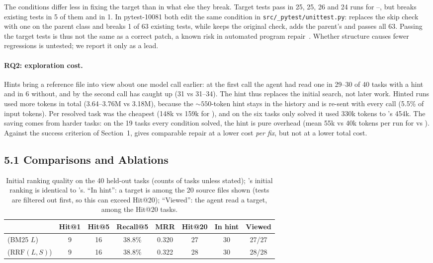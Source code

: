 The conditions differ less in fixing the target than in what else they break. Target tests pass in
25, 25, 26 and 24 runs for \condA--\condD, but \condA{} breaks existing tests in 5 of them and \condC{} in 1.
In pytest-10081 both edit the same condition in \texttt{src/\_pytest/unittest.py}: \condA{} replaces the
skip check with one on the parent class and breaks 1 of 63 existing tests, while \condC{} keeps the
original check, adds the parent's and passes all 63. Passing the target tests is thus not the same as
a correct patch, a known risk in automated program repair~\cite{smith2015cure,yu2019overfitting}.
Whether structure causes fewer regressions is untested; we report it only as a lead.

\paragraph{RQ2: exploration cost.}
Hints bring a reference file into view about one model call earlier: at the first call the agent had
read one in 29--30 of 40 tasks with a hint and in 6 without, and by the second call \condA{} has caught
up (31 vs 31--34). The hint thus replaces the initial search, not later work. Hinted runs used more
tokens in total (3.64--3.76M vs 3.18M), because the ${\sim}550$-token hint stays in the history and is
re-sent with every call (5.5\% of input tokens). Per resolved task \condC{} was the cheapest (148k vs
159k for \condA), and on the six tasks only \condC{} solved it used 330k tokens to \condA's 454k. The
saving comes from harder tasks: on the 19 tasks every condition solved, the hint is pure overhead
(mean 55k vs 40k tokens per run for \condC{} vs \condA). Against the success criterion of Section~1,
\condC{} gives comparable repair at a lower cost \emph{per fix}, but not at a lower total cost.

\subsection*{5.1 Comparisons and Ablations}

\begin{table}[h]
\centering\small
\caption{Initial ranking quality on the 40 held-out tasks (counts of tasks unless stated); \condD's
initial ranking is identical to \condC's. ``In hint'': a target is among the 20 source files shown
(tests are filtered out first, so this can exceed Hit@20); ``Viewed'': the agent read a target, among
the Hit@20 tasks.}
\label{tab:loc}
\begin{tabular}{@{}lccccccc@{}}
\toprule
 & Hit@1 & Hit@5 & Recall@5 & MRR & Hit@20 & In hint & Viewed \\
\midrule
\condB{} (BM25 $L$)            & 9 & 16 & 38.8\% & 0.320 & 27 & 30 & 27/27 \\
\condC{} ($\mathrm{RRF}(L,S)$) & 9 & 16 & 38.8\% & 0.322 & 28 & 30 & 28/28 \\
\bottomrule
\end{tabular}
\end{table}

